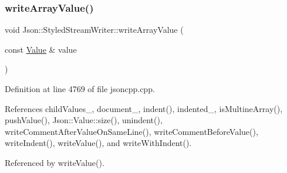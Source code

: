 \subsubsection{\texorpdfstring{write\+Array\+Value()}{writeArrayValue()}}
{\footnotesize\ttfamily void Json\+::\+Styled\+Stream\+Writer\+::write\+Array\+Value (\begin{DoxyParamCaption}\item[{const \hyperlink{class_json_1_1_value}{Value} \&}]{value }\end{DoxyParamCaption})\hspace{0.3cm}{\ttfamily [private]}}



Definition at line 4769 of file jsoncpp.\+cpp.



References child\+Values\+\_\+, document\+\_\+, indent(), indented\+\_\+, is\+Multine\+Array(), push\+Value(), Json\+::\+Value\+::size(), unindent(), write\+Comment\+After\+Value\+On\+Same\+Line(), write\+Comment\+Before\+Value(), write\+Indent(), write\+Value(), and write\+With\+Indent().



Referenced by write\+Value().



